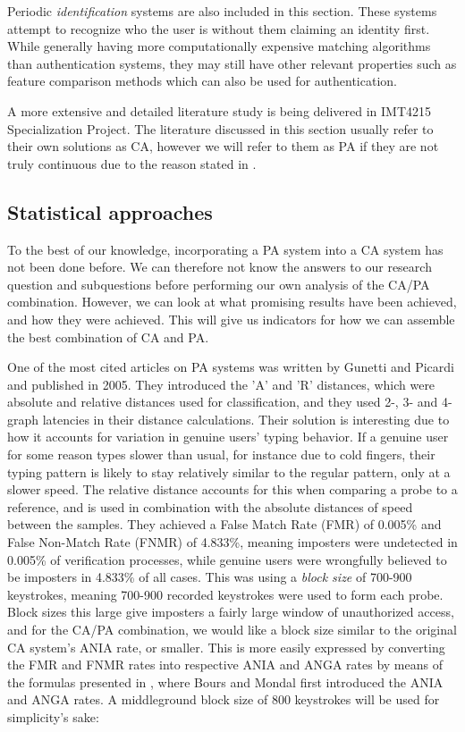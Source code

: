 \documentclass[informationsecurity]{gucmasterproject}
\begin{document}
Periodic \textit{identification} systems are also included in this section.
These systems attempt to recognize who the user is without them claiming an identity first.
While generally having more computationally expensive matching algorithms than authentication systems, they may still have other relevant properties such as feature comparison methods which can also be used for authentication.

A more extensive and detailed literature study \cite{nilsenSpec} is being delivered in IMT4215 Specialization Project.
The literature discussed in this section usually refer to their own solutions as CA, however we will refer to them as PA if they are not truly continuous due to the reason stated in .

\subsection{Statistical approaches}
To the best of our knowledge, incorporating a PA system into a CA system has not been done before. 
We can therefore not know the answers to our research question and subquestions before performing our own analysis of the CA/PA combination.
However, we can look at what promising results have been achieved, and how they were achieved.
This will give us indicators for how we can assemble the best combination of CA and PA.

One of the most cited articles on PA systems was written by Gunetti and Picardi \cite{gnp} and published in 2005.
They introduced the 'A' and 'R' distances, which were absolute and relative distances used for classification, and they used 2-, 3- and 4-graph latencies in their distance calculations.
Their solution is interesting due to how it accounts for variation in genuine users' typing behavior.
If a genuine user for some reason types slower than usual, for instance due to cold fingers, their typing pattern is likely to stay relatively similar to the regular pattern, only at a slower speed.
The relative distance accounts for this when comparing a probe to a reference, and is used in combination with the absolute distances of speed between the samples.
They achieved a False Match Rate (FMR) of 0.005\% and False Non-Match Rate (FNMR) of 4.833\%, meaning imposters were undetected in 0.005\% of verification processes, while genuine users were wrongfully believed to be imposters in 4.833\% of all cases. 
This was using a \textit{block size} of 700-900 keystrokes, meaning 700-900 recorded keystrokes were used to form each probe.
Block sizes this large give imposters a fairly large window of unauthorized access, and for the CA/PA combination, we would like a block size similar to the original CA system's ANIA rate, or smaller.
This is more easily expressed by converting the FMR and FNMR rates into respective ANIA and ANGA rates by means of the formulas presented in \cite{CA-performance}, where Bours and Mondal first introduced the ANIA and ANGA rates.
A middleground block size of 800 keystrokes will be used for simplicity's sake:
\end{document}
